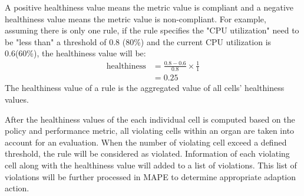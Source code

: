 \documentclass{seal_thesis}
\begin{document}
A positive healthiness value means the metric value is compliant and a negative healthiness value means the metric value is non-compliant.
For example, assuming there is only one rule, if the rule specifies the "CPU utilization" need to be "less than" a threshold of 0.8 (80\%) and the current CPU utilization is 0.6(60\%), the healthiness value will be:
\begin{align*}
\textrm{healthiness} &= \frac{0.8 - 0.6}{0.8} \times \frac{1}{1}\\
&= 0.25
\end{align*}
The healthiness value of a rule is the aggregated value of all cells' healthiness values.

After the healthiness values of the each individual cell is computed based on the policy and performance metric, all violating cells within an organ are taken into account for an evaluation.
When the number of violating cell exceed a defined threshold, the rule will be considered as violated.
Information of each violating cell along with the healthiness value will added to a list of violations.
This list of violations will be further processed in MAPE to determine appropriate adaption action.

\end{document}
